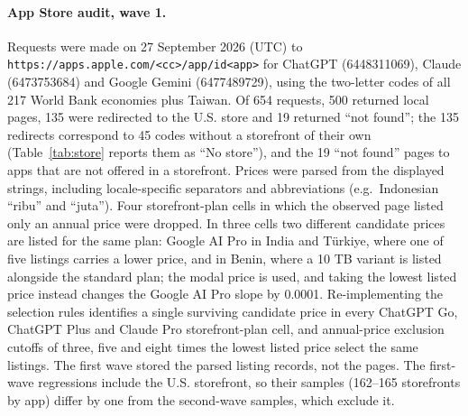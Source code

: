 \documentclass[11pt]{article}
\theoremstyle{definition}
\theoremstyle{remark}
\begin{document}
\paragraph{App Store audit, wave 1.} Requests were made on 27 September 2026 (UTC) to \nolinkurl{https://apps.apple.com/<cc>/app/id<app>} for ChatGPT (6448311069), Claude (6473753684) and Google Gemini (6477489729), using the two-letter codes of all 217 World Bank economies plus Taiwan. Of 654 requests, 500 returned local pages, 135 were redirected to the U.S. store and 19 returned ``not found''; the 135 redirects correspond to 45 codes without a storefront of their own (Table~\ref{tab:store} reports them as ``No store''), and the 19 ``not found'' pages to apps that are not offered in a storefront. Prices were parsed from the displayed strings, including locale-specific separators and abbreviations (e.g.\ Indonesian ``ribu'' and ``juta''). Four storefront-plan cells in which the observed page listed only an annual price were dropped. In three cells two different candidate prices are listed for the same plan: Google AI Pro in India and T\"urkiye, where one of five listings carries a lower price, and in Benin, where a 10 TB variant is listed alongside the standard plan; the modal price is used, and taking the lowest listed price instead changes the Google AI Pro slope by 0.0001. Re-implementing the selection rules identifies a single surviving candidate price in every ChatGPT Go, ChatGPT Plus and Claude Pro storefront-plan cell, and annual-price exclusion cutoffs of three, five and eight times the lowest listed price select the same listings. The first wave stored the parsed listing records, not the pages. The first-wave regressions include the U.S. storefront, so their samples (162--165 storefronts by app) differ by one from the second-wave samples, which exclude it.
\end{document}
